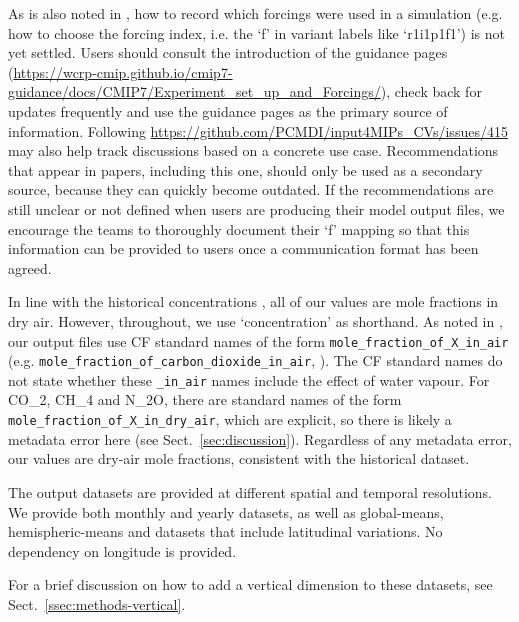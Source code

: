 As is also noted in \citet{nicholls_historical-ghgs_2026}, how to record which forcings were used in a simulation
(e.g. how to choose the forcing index, i.e. the `f' in variant labels like `r1i1p1f1')
is not yet settled.
Users should consult the introduction of the guidance pages \newline
(\mbox{\url{https://wcrp-cmip.github.io/cmip7-guidance/docs/CMIP7/Experiment_set_up_and_Forcings/}}),
check back for updates frequently and use the guidance pages as the primary source of information.
Following \newline \mbox{\url{https://github.com/PCMDI/input4MIPs_CVs/issues/415}}
may also help track discussions based on a concrete use case.
Recommendations that appear in papers, including this one,
should only be used as a secondary source, because they can quickly become outdated.
If the recommendations are still unclear or not defined when users are producing their model output files,
we encourage the teams to thoroughly document their `f' mapping so that this information
can be provided to users once a communication format has been agreed.

In line with the historical concentrations \citep{nicholls_historical-ghgs_2026},
all of our values are mole fractions in dry air.
However, throughout, we use `concentration' as shorthand.
As noted in \citet{nicholls_historical-ghgs_2026},
our output files use CF standard names of the form \texttt{mole\_fraction\_of\_X\_in\_air}
(e.g. \texttt{mole\_fraction\_of\_carbon\_dioxide\_in\_air}, \citealp{eaton_cf-conventions_2026}).
The CF standard names do not state whether these \texttt{\_in\_air} names include the effect of water vapour.
For CO_2, CH_4 and N_2O, there are standard names of the form \texttt{mole\_fraction\_of\_X\_in\_dry\_air},
which are explicit, so there is likely a metadata error here (see Sect.~\ref{sec:discussion}).
Regardless of any metadata error, our values are dry-air mole fractions, consistent with the historical dataset.

The output datasets are provided at different spatial and temporal resolutions.
We provide both monthly and yearly datasets,
as well as global-means, hemispheric-means and datasets that include latitudinal variations.
No dependency on longitude is provided.

For a brief discussion on how to add a vertical dimension to these datasets, see Sect.~\ref{ssec:methods-vertical}.

